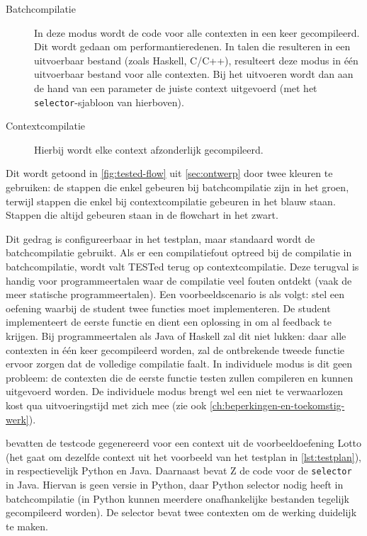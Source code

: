 \begin{description}
    \item[Batchcompilatie] In deze modus wordt de code voor alle contexten in een keer gecompileerd.
    Dit wordt gedaan om performantieredenen.
    In talen die resulteren in een uitvoerbaar bestand (zoals Haskell, C/C++), resulteert deze modus in één uitvoerbaar bestand voor alle contexten.
    Bij het uitvoeren wordt dan aan de hand van een parameter de juiste context uitgevoerd (met het \texttt{selector}-sjabloon van hierboven).
    \item[Contextcompilatie] Hierbij wordt elke context afzonderlijk gecompileerd.
\end{description}

Dit wordt getoond in \cref{fig:tested-flow} uit \cref{sec:ontwerp} door twee kleuren te gebruiken: de stappen die enkel gebeuren bij batchcompilatie zijn in het \textcolor{ugent-ps}{groen}, terwijl stappen die enkel bij contextcompilatie gebeuren in het \textcolor{ugent-we}{blauw} staan.
Stappen die altijd gebeuren staan in de flowchart in het zwart.

Dit gedrag is configureerbaar in het testplan, maar standaard wordt de batchcompilatie gebruikt.
Als er een compilatiefout optreed bij de compilatie in batchcompilatie, wordt valt TESTed terug op contextcompilatie.
Deze terugval is handig voor programmeertalen waar de compilatie veel fouten ontdekt (vaak de meer statische programmeertalen).
Een voorbeeldscenario is als volgt: stel een oefening waarbij de student twee functies moet implementeren.
De student implementeert de eerste functie en dient een oplossing in om al feedback te krijgen.
Bij programmeertalen als Java of Haskell zal dit niet lukken: daar alle contexten in één keer gecompileerd worden, zal de ontbrekende tweede functie ervoor zorgen dat de volledige compilatie faalt.
In individuele modus is dit geen probleem: de contexten die de eerste functie testen zullen compileren en kunnen uitgevoerd worden.
De individuele modus brengt wel een niet te verwaarlozen kost qua uitvoeringstijd met zich mee (zie ook \cref{ch:beperkingen-en-toekomstig-werk}).

 bevatten de testcode gegenereerd voor een context uit de voorbeeldoefening Lotto (het gaat om dezelfde context uit het voorbeeld van het testplan in \cref{lst:testplan}), in respectievelijk Python en Java.
Daarnaast bevat Z de code voor de \texttt{selector} in Java.
Hiervan is geen versie in Python, daar Python selector nodig heeft in batchcompilatie (in Python kunnen meerdere onafhankelijke bestanden tegelijk gecompileerd worden).
De selector bevat twee contexten om de werking duidelijk te maken.

